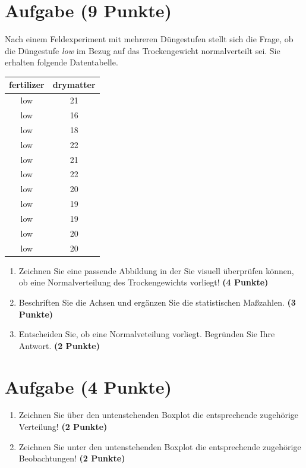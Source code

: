 \documentclass[a4paper, 10pt]{scrartcl}\usepackage[]{graphicx}\usepackage[]{color}
\begin{document}
\section{Aufgabe \hfill (9 Punkte)}

Nach einem Feldexperiment mit mehreren D{\"u}ngestufen stellt sich die Frage,
ob die D{\"u}ngestufe \textit{low} im Bezug auf das Trockengewicht
normalverteilt sei. Sie erhalten folgende Datentabelle.

\begin{table}[!h]
\centering
\begin{tabular}{cc}
\toprule
fertilizer & drymatter\\
\midrule
low & 21\\
low & 16\\
low & 18\\
low & 22\\
low & 21\\
\addlinespace
low & 22\\
low & 20\\
low & 19\\
low & 19\\
low & 20\\
\addlinespace
low & 20\\
\bottomrule
\end{tabular}
\end{table}



\begin{enumerate}
\item Zeichnen Sie eine passende Abbildung in der Sie visuell {\"u}berpr{\"u}fen
  k{\"o}nnen, ob eine Normalverteilung des Trockengewichts vorliegt! \textbf{(4
    Punkte)}
\item Beschriften Sie die Achsen und erg{\"a}nzen Sie die statistischen
  Ma{\ss}zahlen. \textbf{(3 Punkte)}
\item Entscheiden Sie, ob eine Normalveteilung vorliegt. Begr{\"u}nden Sie Ihre
  Antwort. \textbf{(2 Punkte)}
\end{enumerate} 
\clearpage

\section{Aufgabe \hfill (4 Punkte)}



\begin{enumerate}
\item Zeichnen Sie {\"u}ber den untenstehenden Boxplot die entsprechende
  zugeh{\"o}rige Verteilung! \textbf{(2 Punkte)} 
\item Zeichnen Sie unter den untenstehenden Boxplot die entsprechende
  zugeh{\"o}rige Beobachtungen! \textbf{(2 Punkte)}
\end{enumerate}
\end{document}
